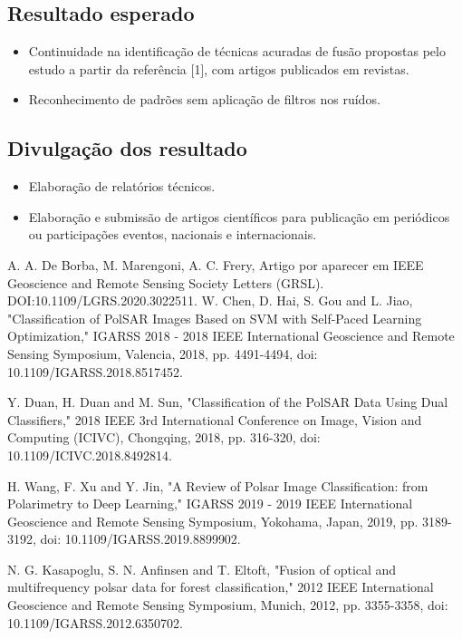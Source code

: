 \documentclass[runningheads]{llncs}
\begin{document}
\subsection{Resultado esperado}

\begin{itemize}
  \item Continuidade na identificação de técnicas acuradas de fusão propostas pelo estudo a partir da referência [1], com artigos publicados em revistas.
  \item Reconhecimento de padrões sem aplicação de filtros nos ruídos.
\end{itemize}

\subsection{Divulgação dos resultado}

\begin{itemize}
  \item Elaboração de relatórios técnicos.
  \item Elaboração e submissão de artigos científicos para publicação em periódicos ou participações eventos, nacionais e internacionais.
\end{itemize}



%
%
%
% 
% 
%
\begin{thebibliography}{8}
A. A. De Borba, M. Marengoni, A. C. Frery, Artigo por aparecer em IEEE Geoscience and Remote Sensing Society Letters (GRSL).  DOI:10.1109/LGRS.2020.3022511. 
W. Chen, D. Hai, S. Gou and L. Jiao, "Classification of PolSAR Images Based on SVM with Self-Paced Learning Optimization," IGARSS 2018 - 2018 IEEE International Geoscience and Remote Sensing Symposium, Valencia, 2018, pp. 4491-4494, doi: 10.1109/IGARSS.2018.8517452.

Y. Duan, H. Duan and M. Sun, "Classification of the PolSAR Data Using Dual Classifiers," 2018 IEEE 3rd International Conference on Image, Vision and Computing (ICIVC), Chongqing, 2018, pp. 316-320, doi: 10.1109/ICIVC.2018.8492814.

H. Wang, F. Xu and Y. Jin, "A Review of Polsar Image Classification: from Polarimetry to Deep Learning," IGARSS 2019 - 2019 IEEE International Geoscience and Remote Sensing Symposium, Yokohama, Japan, 2019, pp. 3189-3192, doi: 10.1109/IGARSS.2019.8899902.

N. G. Kasapoglu, S. N. Anfinsen and T. Eltoft, "Fusion of optical and multifrequency polsar data for forest classification," 2012 IEEE International Geoscience and Remote Sensing Symposium, Munich, 2012, pp. 3355-3358, doi: 10.1109/IGARSS.2012.6350702.
\end{thebibliography}
\end{document}
